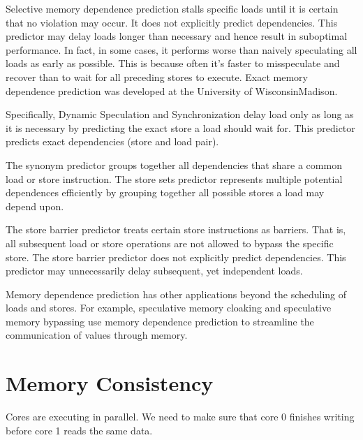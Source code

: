 \documentclass[letterpaper,12pt]{article}
\begin{document}
Selective memory dependence prediction stalls specific loads until it is certain that no violation may occur. It does not explicitly predict dependencies. This predictor may delay loads longer than necessary and hence result in suboptimal performance. In fact, in some cases, it performs worse than naively speculating all loads as early as possible. This is because often it's faster to misspeculate and recover than to wait for all preceding stores to execute. Exact memory dependence prediction was developed at the University of Wisconsin\-Madison.

Specifically, Dynamic Speculation and Synchronization delay load only as long as it is necessary by predicting the exact store a load should wait for. This predictor predicts exact dependencies (store and load pair).

The synonym predictor groups together all dependencies that share a common load or store instruction. The store sets predictor represents multiple potential dependences efficiently by grouping together all possible stores a load may depend upon.

The store barrier predictor treats certain store instructions as barriers. That is, all subsequent load or store operations are not allowed to bypass the specific store. The store barrier predictor does not explicitly predict dependencies. This predictor may unnecessarily delay subsequent, yet independent loads.

Memory dependence prediction has other applications beyond the scheduling of loads and stores. For example, speculative memory cloaking and speculative memory bypassing use memory dependence prediction to streamline the communication of values through memory.
\section{Memory Consistency}
Cores are executing in parallel. We need to make sure that core 0 finishes writing before core 1 reads the same data.
\end{document}
